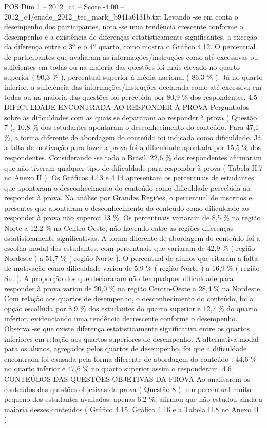 \begin{textsample}{POS Dim 1 – 2012\_c4 – Score -4.00 – 2012\_c4/enade\_2012\_tec\_mark\_b941a6131b.txt}
Levando -se em conta o desempenho dos participantes, nota -se uma tendência crescente conforme o desempenho e a existência de diferenças estatisticamente significantes, a exceção da diferença entre o 3º e o 4º quarto, como mostra o Gráfico 4.12.
O percentual de participantes que avaliaram as informações/instruções como até excessivas ou suficientes em todas ou na maioria das questões foi mais elevado no quarto superior ( 90,3 \% ), percentual superior à média nacional ( 86,3 \% ).
Já no quarto inferior, a suficiência das informações/instruções declarada como até excessiva em todas ou na maioria das questões foi percebida por 80,9 \% dos respondentes. 4.5 DIFICULDADE ENCONTRADA AO RESPONDER À PROVA Perguntados sobre as dificuldades com as quais se depararam ao responder à prova ( Questão 7 ), 10,8 \% dos estudantes apontaram o desconhecimento do conteúdo.
Para 47,1 \%, a forma diferente de abordagem do conteúdo foi indicada como dificuldade.
Já a falta de motivação para fazer a prova foi a dificuldade apontada por 15,5 \% dos respondentes.
Considerando -se todo o Brasil, 22,6 \% dos respondentes afirmaram que não tiveram qualquer tipo de dificuldade para responder à prova ( Tabela II.7 no Anexo II ).
Os Gráficos 4.13 e 4.14 apresentam os percentuais de estudantes que apontaram o desconhecimento do conteúdo como dificuldade percebida ao responder à prova.
Na análise por Grandes Regiões, o percentual de inscritos e presentes que apontaram o desconhecimento do conteúdo como dificuldade ao responder à prova não superou 13 \%.
Os percentuais variaram de 8,5 \% na região Norte a 12,2 \% na Centro-Oeste, não havendo entre as regiões diferenças estatisticamente significativas.
A forma diferente de abordagem do conteúdo foi a escolha modal dos estudantes, com percentuais que variaram de 42,9 \% ( região Nordeste ) a 51,7 \% ( região Norte ).
O percentual de alunos que citaram a falta de motivação como dificuldade variou de 5,9 \% ( região Norte ) a 16,9 \% ( região Sul ).
A proporção dos que declararam não ter qualquer dificuldade para responder à prova variou de 20,0 \% na região Centro-Oeste a 28,4 \% na Nordeste.
Com relação aos quartos de desempenho, o desconhecimento do conteúdo, foi a opção escolhida por 8,9 \% dos estudantes do quarto superior e 12,7 \% do quarto inferior, evidenciando uma tendência decrescente conforme o desempenho.
Observa -se que existe diferença estatisticamente significativa entre os quartos inferiores em relação aos quartos superiores de desempenho.
A alternativa modal para os alunos, agregados pelos quartos de desempenho, foi que a dificuldade encontrada foi causada pela forma diferente de abordagem do conteúdo : 44,6 \% no quarto inferior e 47,6 \% no quarto superior assim o responderam. 4.6 CONTEÚDOS DAS QUESTÕES OBJETIVAS DA PROVA Ao analisarem os conteúdos das questões objetivas da prova ( Questão 8 ), um percentual muito pequeno dos estudantes avaliados, apenas 6,2 \%, afirmou que não estudou ainda a maioria desses conteúdos ( Gráfico 4.15, Gráfico 4.16 e a Tabela II.8 no Anexo II ).

\end{textsample}
